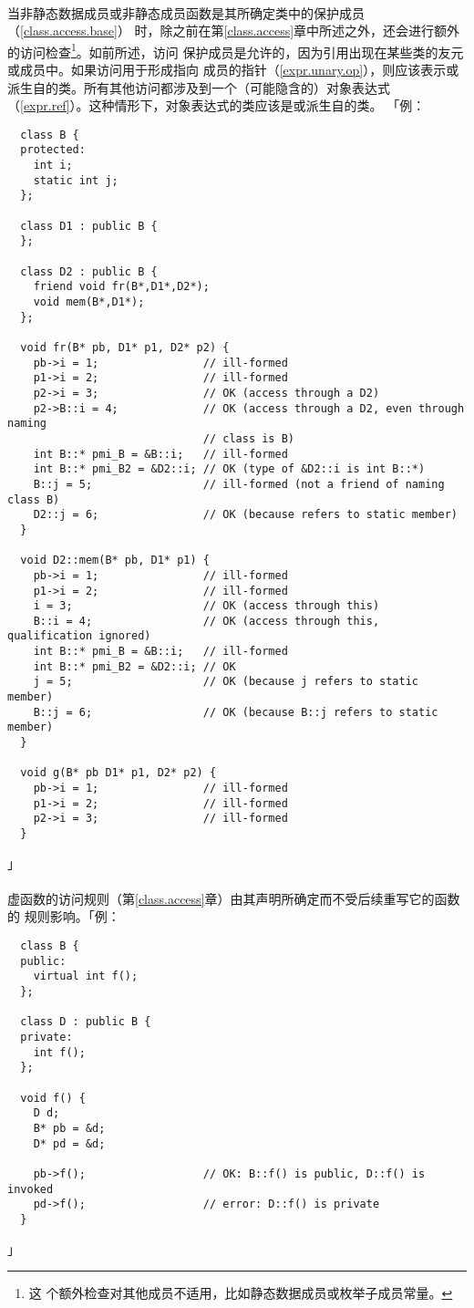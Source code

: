 \paragraph{}
当非静态数据成员或非静态成员函数是其所确定类中的保护成员
（\ref{class.access.base}）
时，除之前在第\ref{class.access}章中所述之外，还会进行额外的访问检查\footnote{这
个额外检查对其他成员不适用，比如静态数据成员或枚举子成员常量。}。如前所述，访问
保护成员是允许的，因为引用出现在某些类的友元或成员中。如果访问用于形成指向
成员的指针（\ref{expr.unary.op}），则应该表示或
派生自的类。所有其他访问都涉及到一个（可能隐含的）对象表达式
（\ref{expr.ref}）。这种情形下，对象表达式的类应该是或派生自的类。
「例：
\begin{lstlisting}
  class B {
  protected:
    int i;
    static int j;
  };

  class D1 : public B {
  };

  class D2 : public B {
    friend void fr(B*,D1*,D2*);
    void mem(B*,D1*);
  };

  void fr(B* pb, D1* p1, D2* p2) {
    pb->i = 1;                // ill-formed
    p1->i = 2;                // ill-formed
    p2->i = 3;                // OK (access through a D2)
    p2->B::i = 4;             // OK (access through a D2, even through naming
                              // class is B)
    int B::* pmi_B = &B::i;   // ill-formed
    int B::* pmi_B2 = &D2::i; // OK (type of &D2::i is int B::*)
    B::j = 5;                 // ill-formed (not a friend of naming class B)
    D2::j = 6;                // OK (because refers to static member)
  }

  void D2::mem(B* pb, D1* p1) {
    pb->i = 1;                // ill-formed
    p1->i = 2;                // ill-formed
    i = 3;                    // OK (access through this)
    B::i = 4;                 // OK (access through this, qualification ignored)
    int B::* pmi_B = &B::i;   // ill-formed
    int B::* pmi_B2 = &D2::i; // OK
    j = 5;                    // OK (because j refers to static member)
    B::j = 6;                 // OK (because B::j refers to static member)
  }

  void g(B* pb D1* p1, D2* p2) {
    pb->i = 1;                // ill-formed
    p1->i = 2;                // ill-formed
    p2->i = 3;                // ill-formed
  }
\end{lstlisting}」

\paragraph{}
虚函数的访问规则（第\ref{class.access}章）由其声明所确定而不受后续重写它的函数的
规则影响。「例：
\begin{lstlisting}
  class B {
  public:
    virtual int f();
  };

  class D : public B {
  private:
    int f();
  };

  void f() {
    D d;
    B* pb = &d;
    D* pd = &d;

    pb->f();                  // OK: B::f() is public, D::f() is invoked
    pd->f();                  // error: D::f() is private
  }
\end{lstlisting}」

